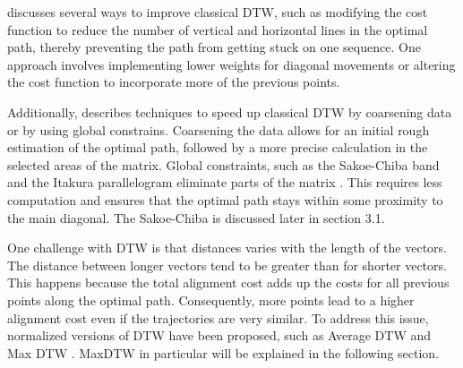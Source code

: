 \textcite{muller2007dynamic} discusses several ways to improve classical DTW, such as modifying the cost function to reduce the number of vertical and horizontal lines in the optimal path, thereby preventing the path from getting stuck on one sequence. One approach involves implementing lower weights for diagonal movements or altering the cost function to incorporate more of the previous points.

Additionally, \textcite{muller2007dynamic} describes techniques to speed up classical DTW by coarsening data or by using global constrains. Coarsening the data allows for an initial rough estimation of the optimal path, followed by a more precise calculation in the selected areas of the matrix. Global constraints, such as the Sakoe-Chiba band and the Itakura parallelogram eliminate parts of the matrix \cite{muller2007dynamic}. This requires less computation and ensures that the optimal path stays within some proximity to the main diagonal. The Sakoe-Chiba is discussed later in section 3.1.

One challenge with DTW is that distances varies with the length of the vectors. The distance between longer vectors tend to be greater than for shorter vectors. This happens because the total alignment cost adds up the costs for all previous points along the optimal path. Consequently, more points lead to a higher alignment cost even if the trajectories are very similar. To address this issue, normalized versions of DTW have been proposed, such as Average DTW and Max DTW \cite{zhao2018rest}. MaxDTW in particular will be explained in the following section.

